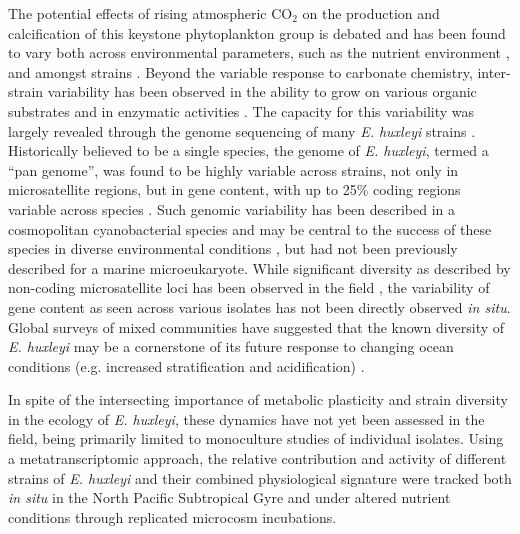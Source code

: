 The potential effects of rising atmospheric CO$_2$ \citep{Raven2005, Meinshausen2011} on the production and calcification of this keystone phytoplankton group is debated and has been found to vary both across environmental parameters, such as the nutrient environment \citep{Sciandra2003, Leonardos2005, Rouco2013}, and amongst strains \citep{Riebesell2000, Iglesias-Rodriguez2008, Langer2009}. Beyond the variable response to carbonate chemistry, inter-strain variability has been observed in the ability to grow on various organic substrates \citep{Strom2009} and in enzymatic activities \citep{Steinke1998, Dyhrman2003, Alcolombri2015}. The capacity for this variability was largely revealed through the genome sequencing of many \textit{E. huxleyi} strains \citep{Read2013}. Historically believed to be a single species, the genome of \textit{E. huxleyi}, termed a ``pan genome'', was found to be highly variable across strains, not only in microsatellite regions, but in gene content, with up to 25\% coding regions variable across species \citep{Read2013}. Such genomic variability has been described in a cosmopolitan cyanobacterial species \citep{Kashtan2014} and may be central to the success of these species in diverse environmental conditions \citep{Biller2014}, but had not been previously described for a marine microeukaryote. While significant diversity as described by non-coding microsatellite loci has been observed in the field \citep{Iglesias-Rodriguez2006}, the variability of gene content as seen across various isolates has not been directly observed \textit{in situ}. Global surveys of mixed communities have suggested that the known diversity of \textit{E. huxleyi} may be a cornerstone of its future response to changing ocean conditions (e.g. increased stratification and acidification) \citep{Beaufort2011}.\par

In spite of the intersecting importance of metabolic plasticity and strain diversity in the ecology of \textit{E. huxleyi}, these dynamics have not yet been assessed in the field, being primarily limited to monoculture studies of individual isolates. Using a metatranscriptomic approach, the relative contribution and activity of different strains of \textit{E. huxleyi} and their combined physiological signature were tracked both \textit{in situ} in the North Pacific Subtropical Gyre and under altered nutrient conditions through replicated microcosm incubations.  \par



